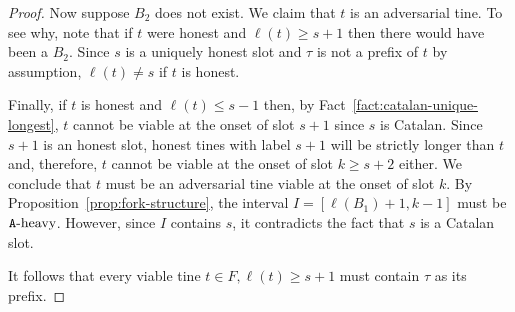 \begin{proof}
    Now suppose $B_2$ does not exist.  We claim that $t$ is an
    adversarial tine.  To see why, note that if $t$ were honest and
    $\ell(t) \geq s + 1$ then there would have been a $B_2$.  Since
    $s$ is a uniquely honest slot and $\tau$ is not a prefix of $t$ by
    assumption, $\ell(t) \neq s$ if $t$ is honest.

    
    Finally, if $t$ is honest and $\ell(t) \leq s - 1$ then, 
    by Fact~\ref{fact:catalan-unique-longest}, 
    $t$ cannot be viable at the onset of slot $s + 1$ 
    since $s$ is Catalan. 
    Since $s + 1$ is an honest slot, 
    honest tines with label $s + 1$ will be strictly longer than $t$ 
    and, therefore, 
    $t$ cannot be viable at the onset of slot $k \geq s + 2$ either. 
    We conclude that $t$ must be an adversarial tine viable at the onset of slot $k$. 
    By Proposition~\ref{prop:fork-structure},       
    the interval $I = [\ell(B_1) + 1, k - 1]$ must be $\mathtt{A}\text{-heavy}$. 
    However, since $I$ contains $s$, it contradicts the fact that $s$ is a Catalan slot. 

    It follows that every viable tine 
    $t \in F, \ell(t) \geq s + 1$ must contain $\tau$ as its prefix. 
  \end{proof}



